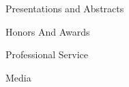 \documentclass{resume2} %
\begin{document}
\begin{rSection}{Presentations and Abstracts}

\end{rSection}

\vspace*{0.3 em}
\begin{rSection}{Honors And Awards}

\end{rSection}

\begin{rSection}{Professional Service}

\end{rSection}




\begin{rSection}{Media}



\end{rSection}

\end{document}
